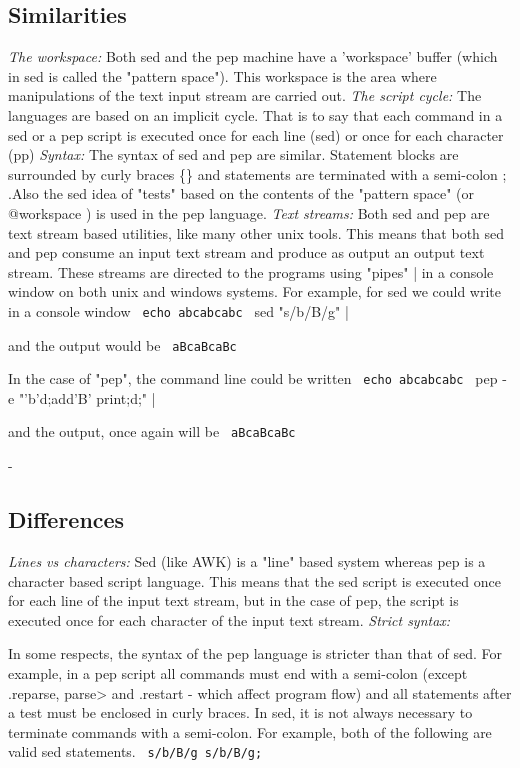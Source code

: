 \documentclass[a4paper,12pt]{article}
\begin{document}
\subsection{Similarities}
 \emph{ The workspace: }
    Both sed and the pep machine have a 'workspace' buffer (which in sed is
    called the "pattern space"). This workspace is the area where
    manipulations of the text input stream are carried out.
 \emph{ The script cycle: }
    The languages are based on an implicit cycle. That is to say
    that each command in a sed or a pep script is executed once
    for each line (sed) or once for each character (pp)
 \emph{ Syntax: }
    The syntax of sed and pep are similar. Statement blocks are
    surrounded by curly braces \{\} and statements are terminated with
    a semi-colon ; .Also the sed idea of "tests" based on the contents
    of the "pattern space" (or @workspace ) is used in the pep
    language.
 \emph{ Text streams: }
    Both sed and pep are text stream based utilities, like many
    other unix tools. This means that both sed and pep consume an
    input text stream and produce as output an output text stream.
    These streams are directed to the programs using "pipes" | in a
    console window on both unix and windows systems. For example, for
    sed we could write in a console window 
 \verb| echo abcabcabc | sed "s/b/B/g" |

    and the output would be 
 \verb| aBcaBcaBc |

    In the case of "pep", the command line could be written 
 \verb| echo abcabcabc | pep -e "'b'{d;add'B'} print;d;" |


   and the output, once again will be 
 \verb| aBcaBcaBc |

    -

\subsection{Differences}
 \emph{ Lines vs characters: }
     Sed (like AWK) is a "line" based system whereas pep is a character
     based script language. This means that the sed script is
     executed once for each line of the input text stream, but in the
     case of pep, the script is executed once for each character
     of the input text stream.
 \emph{ Strict syntax: }

     In some respects, the syntax of the pep language is stricter than
     that of sed. For example, in a pep script all commands must end with a
     semi-colon (except .reparse, parse> and .restart - which affect program
     flow) and all statements after a test must be enclosed in curly braces.
     In sed, it is not always necessary to terminate commands with a
     semi-colon. For example, both of the following are valid sed statements. 
 \verb| s/b/B/g s/b/B/g; |
\end{document}
